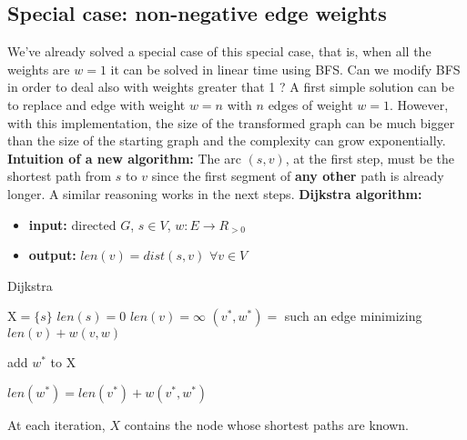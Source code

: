 \subsection{Special case: non-negative edge weights}
We've already solved a special case of this special case, that is, when all the weights are $w = 1$ it can be solved in linear time using BFS.\newline\newline
Can we modify BFS in order to deal also with weights greater that 1 ? A first simple solution can be to replace and edge with weight $w = n$ with $n$ edges of weight $w = 1$. However, with this implementation, the size of the transformed graph can be much bigger than the size of the starting graph and the complexity can grow exponentially.\newline\newline
\textbf{Intuition of a new algorithm:}\newline\newline
The arc $(s, v)$, at the first step, must be the shortest path from $s$ to $v$ since the first segment of \textbf{any other} path is already longer. A similar reasoning works in the next steps.\newline\newline
\textbf{Dijkstra algorithm:}
\begin{itemize}
    \item \textbf{input:} directed $G$, $s \in V$, $w: E \rightarrow R_{>0}$

    \item \textbf{output:} $len(v) = dist(s, v) \,\, \forall v \in V$
\end{itemize}
\begin{algorithm}
\caption{Dijkstra}\label{Dijkstra}
    \begin{algorithmic}[1]
        \State $\text{X} = \{s\}$
        \State $len(s) = 0$
        \State $len(v) = \infty$
            \State $(v^{*}, w^{*}) = $ such an edge minimizing $len(v) + w(v, w)$

            \State add $w^{*}$ to X

            \State $len(w^{*}) = len(v^{*}) + w(v^{*}, w^{*})$
        \EndWhile
    \EndProcedure
    \end{algorithmic}
\end{algorithm}
At each iteration, $X$ contains the node whose shortest paths are known.\newline\newline
